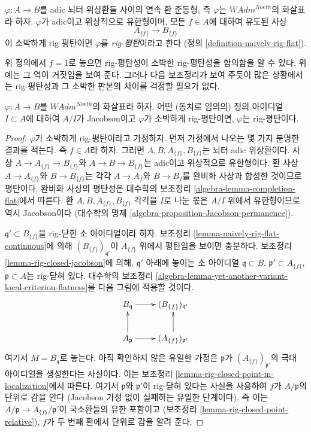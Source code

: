 \begin{definition}
\label{definition-rig-flat-continuous-homomorphism}
$\varphi : A \to B$를 adic 뇌터 위상환들 사이의 연속 환 준동형,
즉 $\varphi$는 $\textit{WAdm}^{Noeth}$의 화살표라 하자.
$\varphi$가 adic이고 위상적으로 유한형이며, 모든 $f \in A$에 대하여
유도된 사상
$$
A_{\{f\}} \longrightarrow B_{\{f\}}
$$
이 소박하게 rig-평탄이면 $\varphi$를 {\it rig-평탄}이라고 한다
(정의 \ref{definition-naively-rig-flat}).
\end{definition}

\noindent
위 정의에서 $f = 1$로 놓으면 rig-평탄성이 소박한 rig-평탄성을 함의함을 알 수 있다.
위 예는 그 역이 거짓임을 보여 준다. 그러나 다음 보조정리가 보여 주듯이
많은 상황에서는 rig-평탄성과 그 소박한 판본의 차이를 걱정할 필요가 없다.

\begin{lemma}
\label{lemma-rig-flat-naive}
$\varphi : A \to B$를 $\textit{WAdm}^{Noeth}$의 화살표라 하자.
어떤 (동치로 임의의) 정의 아이디얼 $I \subset A$에 대하여
$A/I$가 Jacobson이고 $\varphi$가 소박하게 rig-평탄이면,
$\varphi$는 rig-평탄이다.
\end{lemma}

\begin{proof}
$\varphi$가 소박하게 rig-평탄이라고 가정하자.
먼저 가정에서 나오는 몇 가지 분명한 결과를 적는다. 즉 $f \in A$라 하자.
그러면 $A, B, A_{\{f\}}, B_{\{f\}}$는 뇌터 adic 위상환이다.
사상 $A \to A_{\{f\}} \to B_{\{f\}}$와
$A \to B \to B_{\{f\}}$는 adic이고 위상적으로 유한형이다.
환 사상 $A \to A_{\{f\}}$와 $B \to B_{\{f\}}$는 각각
$A \to A_f$와 $B \to B_f$를 완비화 사상과 합성한 것이므로 평탄이다.
완비화 사상의 평탄성은 대수학의 보조정리
\ref{algebra-lemma-completion-flat}에서 따른다.
환 $A, B, A_{\{f\}}, B_{\{f\}}$ 각각을 $I$로 나눈 몫은
$A/I$ 위에서 유한형이므로 역시 Jacobson이다
(대수학의 명제 \ref{algebra-proposition-Jacobson-permanence}).

\medskip\noindent
$\mathfrak q' \subset B_{\{f\}}$을 rig-닫힌 소 아이디얼이라 하자.
보조정리 \ref{lemma-naively-rig-flat-continuous}에 의해
$(B_{\{f\}})_{\mathfrak q'}$이 $A_{\{f\}}$ 위에서 평탄임을 보이면 충분하다.
보조정리 \ref{lemma-rig-closed-jacobson}에 의해,
$\mathfrak q'$ 아래에 놓이는 소 아이디얼
$\mathfrak q \subset B$, $\mathfrak p' \subset A_{\{f\}}$,
$\mathfrak p \subset A$는 rig-닫혀 있다.
대수학의 보조정리
\ref{algebra-lemma-yet-another-variant-local-criterion-flatness}를
다음 그림에 적용할 것이다.
$$
\xymatrix{
B_\mathfrak q \ar[r] &
(B_{\{f\}})_{\mathfrak q'} \\
A_\mathfrak p \ar[u] \ar[r] &
(A_{\{f\}})_{\mathfrak p'} \ar[u]
}
$$
여기서 $M = B_\mathfrak q$로 놓는다. 아직 확인하지 않은 유일한 가정은
$\mathfrak p$가 $(A_{\{f\}})_{\mathfrak p'}$의 극대 아이디얼을 생성한다는 사실이다.
이는 보조정리 \ref{lemma-rig-closed-point-in-localization}에서 따른다.
여기서 $\mathfrak p$와 $\mathfrak p'$이 rig-닫혀 있다는 사실을 사용하여
$f$가 $A/\mathfrak p$의 단위로 감을 안다
(Jacobson 가정 없이 실패하는 유일한 단계이다). 즉 이는
$A/\mathfrak p \to A_{\{f\}}/\mathfrak p'$이 국소환들의 유한 포함이고
(보조정리 \ref{lemma-rig-closed-point-relative}),
$f$가 두 번째 환에서 단위로 감을 알려 준다.
\end{proof}

